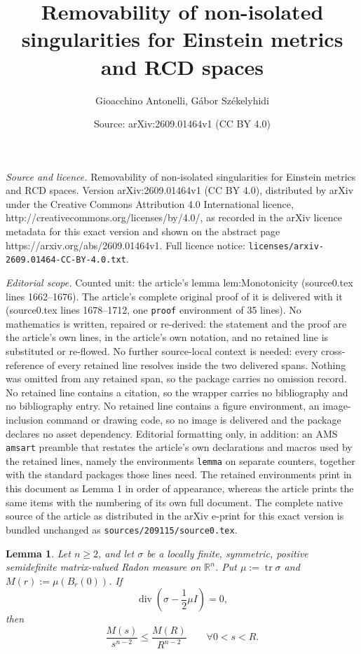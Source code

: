 \documentclass[10pt,a4paper]{amsart}
\title{Removability of non-isolated singularities for Einstein metrics and RCD spaces}
\author{Gioacchino Antonelli, G\'abor Sz\'ekelyhidi}
\date{Source: arXiv:2609.01464v1 (CC BY 4.0)}
\newtheorem{lemma}{Lemma}
\renewcommand{\geq}{\geqslant}
\renewcommand{\leq}{\leqslant}
\begin{document}
\maketitle

\noindent\emph{Source and licence.} Removability of non-isolated singularities for Einstein metrics and RCD spaces. Version arXiv:2609.01464v1 (CC BY 4.0), distributed by arXiv under the Creative Commons Attribution 4.0 International licence, http://creativecommons.org/licenses/by/4.0/, as recorded in the arXiv licence metadata for this exact version and shown on the abstract page https://arxiv.org/abs/2609.01464v1. Full licence notice: \texttt{licenses/arxiv-2609.01464-CC-BY-4.0.txt}.\par\smallskip

\noindent\textit{Editorial scope.} Counted unit: the article's lemma lem:Monotonicity (source0.tex lines 1662--1676). The article's complete original proof of it is delivered with it (source0.tex lines 1678--1712, one \texttt{proof} environment of 35 lines). No mathematics is written, repaired or re-derived: the statement and the proof are the article's own lines, in the article's own notation, and no retained line is substituted or re-flowed.  No further source-local context is needed: every cross-reference of every retained line resolves inside the two delivered spans.  Nothing was omitted from any retained span, so the package carries no omission record.  No retained line contains a citation, so the wrapper carries no bibliography and no bibliography entry.  No retained line contains a figure environment, an image-inclusion command or drawing code, so no image is delivered and the package declares no asset dependency.  Editorial formatting only, in addition: an AMS \texttt{amsart} preamble that restates the article's own declarations and macros used by the retained lines, namely the environments \texttt{lemma} on separate counters, together with the standard packages those lines need.  The retained environments print in this document as Lemma 1 in order of appearance, whereas the article prints the same items with the numbering of its own full document.  The complete native source of the article as distributed in the arXiv e-print for this exact version is bundled unchanged as \texttt{sources/209115/source0.tex}.
\begin{lemma}\label{lem:Monotonicity}
Let $n\geq2$, and let $\sigma$ be a locally finite, symmetric,
positive semidefinite matrix-valued Radon measure on $\mathbb R^n$. Put
$\mu:=\operatorname{tr}\sigma$ and $M(r):=\mu(B_r(0))$. If
\begin{equation}
 \operatorname{div}\left(\sigma-\frac12\mu I\right)=0,
 \label{eq:stationary-assumption}
\end{equation}
then
\begin{equation}
 \frac{M(s)}{s^{n-2}}\leq\frac{M(R)}{R^{n-2}}
 \qquad \forall 0<s<R.
 \label{eq:stationary-monotonicity}
\end{equation}
\end{lemma}
\end{document}
